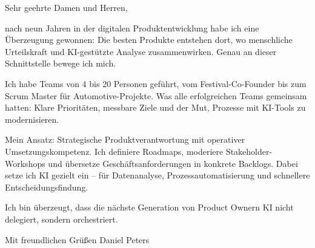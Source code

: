 Sehr geehrte Damen und Herren,

nach neun Jahren in der digitalen Produktentwicklung habe ich eine Überzeugung gewonnen:
Die besten Produkte entstehen dort, wo menschliche Urteilskraft und KI-gestützte Analyse
zusammenwirken. Genau an dieser Schnittstelle bewege ich mich.

Ich habe Teams von 4 bis 20 Personen geführt, vom Festival-Co-Founder bis zum Scrum Master
für Automotive-Projekte. Was alle erfolgreichen Teams gemeinsam hatten: Klare Prioritäten,
messbare Ziele und der Mut, Prozesse mit KI-Tools zu modernisieren.

Mein Ansatz: Strategische Produktverantwortung mit operativer Umsetzungskompetenz.
Ich definiere Roadmaps, moderiere Stakeholder-Workshops und übersetze Geschäftsanforderungen
in konkrete Backlogs. Dabei setze ich KI gezielt ein -- für Datenanalyse, Prozessautomatisierung
und schnellere Entscheidungsfindung.

Ich bin überzeugt, dass die nächste Generation von Product Ownern KI nicht delegiert,
sondern orchestriert.

Mit freundlichen Grüßen
Daniel Peters
